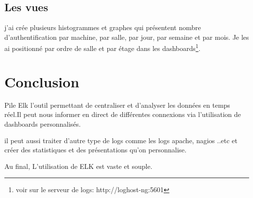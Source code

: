\documentclass[11pt,a4paper]{article}
\begin{document}
\subsection{Les vues}

j'ai crée plusieurs histogrammes et graphes qui présentent nombre d'authentification par machine, par salle, par jour, par semaine et par mois. Je les ai positionné par ordre de salle et par étage dans les dashboards\footnote{voir sur le serveur de logs: http://loghost-ng:5601}. \\

\section{Conclusion}

Pile Elk l'outil permettant de centraliser et d’analyser les données en temps réel.Il peut nous informer en direct de différentes connexions via l’utilisation de dashboards personnalisés.

il peut aussi traiter d'autre type de logs comme les logs apache, nagios ..etc et créer des statistiques et des présentations qu'on personnalise. 

Au final, L'utilisation de ELK est vaste et souple. 
\end{document}
